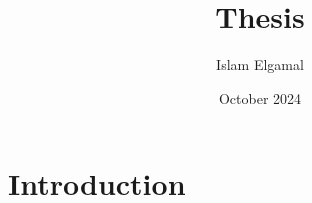\documentclass{article}
\title{Thesis}
\author{Islam Elgamal}
\date{October 2024}
\begin{document}
\maketitle

\section{Introduction}
\end{document}
